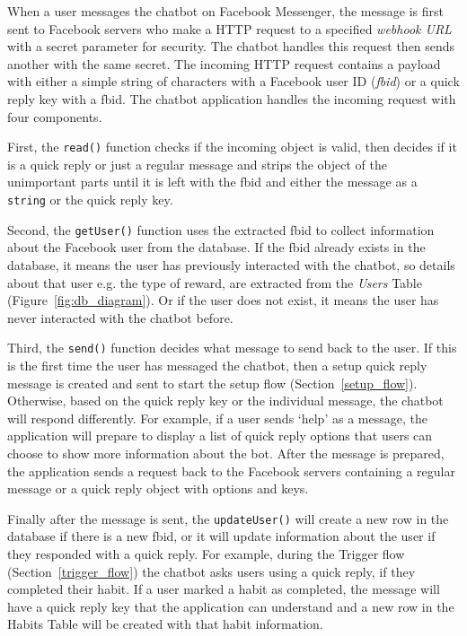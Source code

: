 When a user messages the chatbot on Facebook Messenger, the message is first sent to Facebook servers who make a HTTP request to a specified \textit{webhook URL} with a secret parameter for security. The chatbot handles this request then sends another with the same secret. The incoming HTTP request contains a payload with either a simple string of characters with a Facebook user ID (\textit{fbid}) or a quick reply key with a fbid. The chatbot application handles the incoming request with four components.

First, the \verb|read()| function checks if the incoming object is valid, then decides if it is a quick reply or just a regular message and strips the object of the unimportant parts until it is left with the fbid and either the message as a \verb|string| or the quick reply key.

Second, the \verb|getUser()| function uses the extracted fbid to collect information about the Facebook user from the database. If the fbid already exists in the database, it means the user has previously interacted with the chatbot, so details about that user e.g. the type of reward, are extracted from the \textit{Users} Table (Figure~\ref{fig:db_diagram}). Or if the user does not exist, it means the user has never interacted with the chatbot before.

Third, the \verb|send()| function decides what message to send back to the user. If this is the first time the user has messaged the chatbot, then a setup quick reply message is created and sent to start the setup flow (Section~\ref{setup_flow}). Otherwise, based on the quick reply key or the individual message, the chatbot will respond differently. For example, if a user sends `help' as a message, the application will prepare to display a list of quick reply options that users can choose to show more information about the bot. After the message is prepared, the application sends a request back to the Facebook servers containing a regular message or a quick reply object with options and keys.

Finally after the message is sent, the \verb|updateUser()| will create a new row in the database if there is a new fbid, or it will update information about the user if they responded with a quick reply. For example, during the Trigger flow (Section~\ref{trigger_flow}) the chatbot asks users using a quick reply, if they completed their habit. If a user marked a habit as completed, the message will have a quick reply key that the application can understand and a new row in the Habits Table will be created with that habit information.

